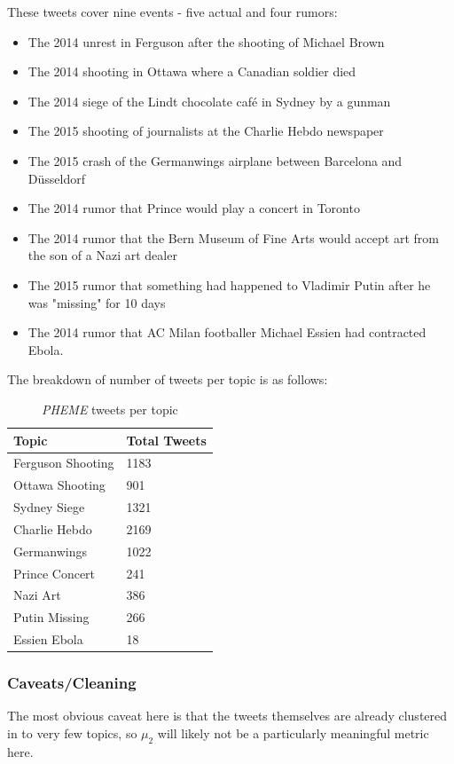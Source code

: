 \documentclass[preprint,review,12pt]{elsarticle}
\begin{document}
These tweets cover nine events - five actual and four rumors:
\begin{itemize}
    \item The 2014 unrest in Ferguson after the shooting of Michael Brown
    \item The 2014 shooting in Ottawa where a Canadian soldier died
    \item The 2014 siege of the Lindt chocolate caf{\'e} in Sydney by a gunman 
    \item The 2015 shooting of journalists at the Charlie Hebdo newspaper
    \item The 2015 crash of the Germanwings airplane between Barcelona and D\"{u}sseldorf
    \item The 2014 rumor that Prince would play a concert in Toronto
    \item The 2014 rumor that the Bern Museum of Fine Arts would accept art from the son of a Nazi art dealer
    \item The 2015 rumor that something had happened to Vladimir Putin after he was "missing" for 10 days
    \item The 2014 rumor that AC Milan footballer Michael Essien had contracted Ebola.
\end{itemize}
The breakdown of number of tweets per topic is as follows:
\begin{table}[h]
    \centering
    \begin{tabular}{|p{4cm}|p{3cm}|}
    \hline
    Topic & Total Tweets \\
    \hline
         Ferguson Shooting & 1183 \\
         Ottawa Shooting & 901 \\
         Sydney Siege & 1321 \\
         Charlie Hebdo & 2169 \\
         Germanwings & 1022 \\
         Prince Concert & 241 \\
         Nazi Art & 386 \\
         Putin Missing & 266 \\
         Essien Ebola & 18 \\
    \hline
    \end{tabular}
    \caption{\textit{PHEME} tweets per topic}
    \label{tab:pheme tweets per topic}
\end{table}

\subsubsection{Caveats/Cleaning}
\label{PHEME caveeats}
The most obvious caveat here is that the tweets themselves are already clustered in to very few topics, so $\mu_2$ will likely not be a particularly meaningful metric here.
\end{document}

